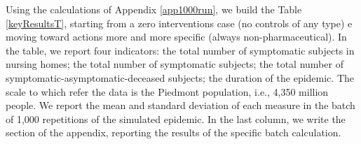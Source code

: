 \documentclass[11pt]{article}
\begin{document}
Using the calculations of Appendix \ref{app1000run}, we build the Table \ref{keyResultsT}, starting from a zero interventions case (no controls of any type) e moving toward actions more and more specific (always non-pharmaceutical). In the table, we report four indicators: the total number of symptomatic subjects in nursing homes; the total number of symptomatic subjects; the total number of symptomatic-asymptomatic-deceased subjects; the duration of the epidemic. The scale to which refer the data is the Piedmont population, i.e., 4,350 million people. We report the mean and standard deviation of each measure in the batch of 1,000 repetitions of the simulated epidemic. In the last column, we write the section of the appendix, reporting the results of the specific batch calculation.
\end{document}
